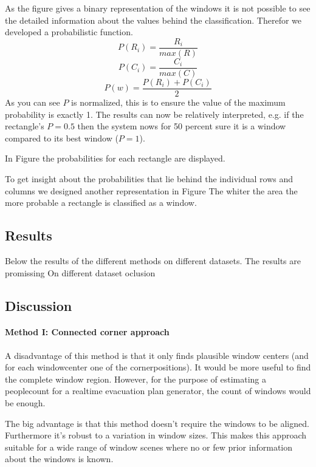As the figure gives a binary representation of the windows it is not possible
to see the detailed information about the values behind the classification.
Therefor we developed a probabilistic function. 
\[P(R_i) = \frac{R_i}{max(R)}\]
\[P(C_i) = \frac{C_i}{max(C)}\]
\[P(w) = \frac{P(R_i) + P(C_i)}{2}\]
As you can see $P$ is normalized, this is to ensure the value of the maximum
probability is exactly 1. The results can now be relatively interpreted, e.g. if the rectangle's $P=0.5$
then the system nows for 50 percent sure it is a window compared to its best window ($P=1$).

In Figure %
the probabilities for each rectangle are displayed.

To get insight about the probabilities that lie behind the individual rows and columns
we designed another representation in Figure %
The whiter the area the more probable a rectangle is classified as a window.




\subsection{Results}
Below the results of the different methods on different datasets.
The results are promissing
On different dataset 
oclusion

\subsection{Discussion}  %
\paragraph{Method I: Connected corner approach} 
A disadvantage of this method is that it only finds plausible window centers
(and for each windowcenter one of the cornerpositions).  It would be more
useful to find the complete window region. However, for the purpose of estimating
a peoplecount for a realtime evacuation plan generator, the count of windows
would be enough.

The big advantage is that this method doesn't require the windows to be aligned.
Furthermore it's robust to a variation in window sizes. This makes this approach suitable
for a wide range of window scenes where no or few prior information about the
	windows is known.



